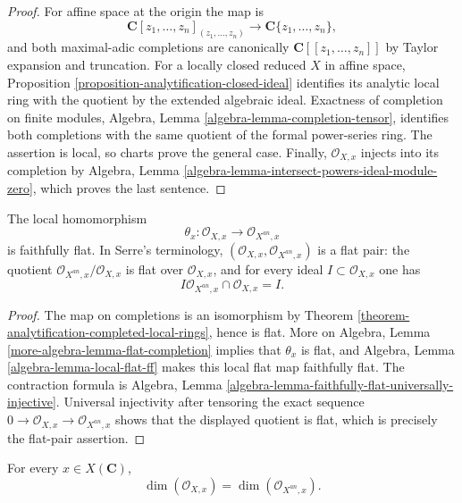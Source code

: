 \begin{proof}
For affine space at the origin the map is
$$
\mathbf C[z_1,\ldots,z_n]_{(z_1,\ldots,z_n)}
\longrightarrow \mathbf C\{z_1,\ldots,z_n\},
$$
and both maximal-adic completions are canonically
$\mathbf C[[z_1,\ldots,z_n]]$ by Taylor expansion and truncation. For a
locally closed reduced $X$ in affine space, Proposition
\ref{proposition-analytification-closed-ideal} identifies its analytic local
ring with the quotient by the extended algebraic ideal. Exactness of
completion on finite modules, Algebra, Lemma
\ref{algebra-lemma-completion-tensor}, identifies both completions with the
same quotient of the formal power-series ring. The assertion is local, so
charts prove the general case. Finally, $\mathcal O_{X,x}$ injects into its
completion by Algebra, Lemma
\ref{algebra-lemma-intersect-powers-ideal-module-zero}, which proves the last
sentence.
\end{proof}

\begin{theorem}
\label{theorem-analytification-local-faithfully-flat}
The local homomorphism
$$
\theta_x : \mathcal O_{X,x} \longrightarrow \mathcal O_{X^{an},x}
$$
is faithfully flat. In Serre's terminology,
$(\mathcal O_{X,x},\mathcal O_{X^{an},x})$ is a flat pair: the quotient
$\mathcal O_{X^{an},x}/\mathcal O_{X,x}$ is flat over $\mathcal O_{X,x}$,
and for every ideal $I \subset \mathcal O_{X,x}$ one has
$$
I\mathcal O_{X^{an},x}\cap\mathcal O_{X,x}=I.
$$
\end{theorem}

\begin{proof}
The map on completions is an isomorphism by
Theorem \ref{theorem-analytification-completed-local-rings}, hence is flat.
More on Algebra, Lemma \ref{more-algebra-lemma-flat-completion} implies that
$\theta_x$ is flat, and Algebra, Lemma
\ref{algebra-lemma-local-flat-ff} makes this local flat map faithfully flat.
The contraction formula is Algebra, Lemma
\ref{algebra-lemma-faithfully-flat-universally-injective}. Universal
injectivity after tensoring the exact sequence
$0\to\mathcal O_{X,x}\to\mathcal O_{X^{an},x}$ shows that the displayed
quotient is flat, which is precisely the flat-pair assertion.
\end{proof}

\begin{lemma}
\label{lemma-analytification-local-dimension}
For every $x \in X(\mathbf C)$,
$$
\dim(\mathcal O_{X,x})=\dim(\mathcal O_{X^{an},x}).
$$
\end{lemma}

